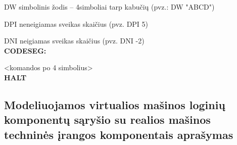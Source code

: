 DW simbolinis žodis – 4simboliai tarp kabučių (pvz.: DW "ABCD")

DPI neneigiamas sveikas skaičius (pvz. DPI 5)

DNI neigiamas sveikas skaičius (pvz. DNI -2)
\\\textbf{CODESEG:}

<komandos po 4 simbolius>\\
\textbf{HALT}

\subsection{Modeliuojamos virtualios mašinos loginių komponentų sąryšio su 
realios mašinos techninės įrangos komponentais aprašymas}

   


